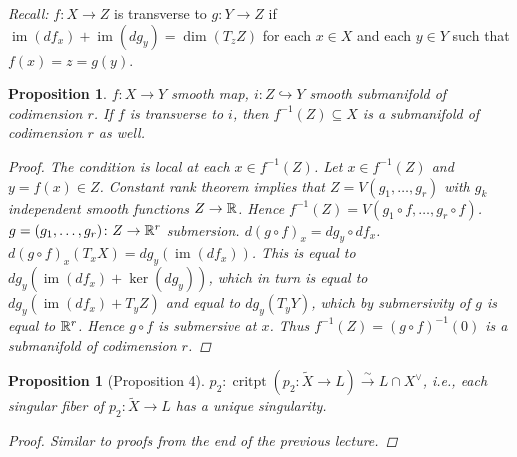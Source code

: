 \documentclass[A4paper, british, reqno]{amsart}
\theoremstyle{darkgreentheorem}
\newtheorem{prop}[thm]{Proposition}
\theoremstyle{darkbluedefinition}
\theoremstyle{darkredexample}
\theoremstyle{remark}
\DeclareMathOperator{\im}{im}
\newcommand{\1}{\mathbbm{1}}
\newcommand{\dual}{^{\vee}}
\newcommand{\sub}{\subseteq}
\newcommand{\mono}{\hookrightarrow}
\begin{document}
\textit{Recall:} $f\colon X\to Z$ is transverse to $g\colon Y\to Z$ if $\im(df_{x})+\im(dg_{y})=\dim(T_{z}Z)$ for each $x\in X$ and each $y\in Y$ such that $f(x)=z=g(y)$.

\begin{prop}
    $f\colon X\to Y$ smooth map, $i\colon Z\mono Y$ smooth submanifold of codimension $r$.
    If $f$ is transverse to $i$, then $f^{-1}(Z)\sub X$ is a submanifold of codimension $r$ as well.
    \begin{proof}
	The condition is local at each $x\in f^{-1}(Z)$.
	Let $x\in f^{-1}(Z)$ and $y=f(x)\in Z$.
	Constant rank theorem implies that $Z=V(g_{1},\ldots,g_{r})$ with $g_{k}$ independent smooth functions $Z\to \mathbb{R}$.
	Hence $f^{-1}(Z)=V(g_{1}\circ f,\ldots,g_{r}\circ f)$.
	$g=(g_{1},\ldots,g_{r})\colon Z\to \mathbb{R}^{r}$ submersion.
	$d(g\circ f)_{x}=dg_{y} \circ df_{x}$.
	$d(g\circ f)_{x}(T_{x}X)=dg_{y}(\im(df_{x}))$.
	This is equal to $dg_{y}(\im(df_{x})+\ker(dg_{y}))$, which in turn is equal to $dg_{y}(\im(df_{x})+T_{y}Z)$ and equal to $dg_{y}(T_{y}Y)$, which by submersivity of $g$ is equal to $\mathbb{R}^{r}$.
	Hence $g\circ f$ is submersive at $x$.
	Thus $f^{-1}(Z)=(g\circ f)^{-1}(0)$ is a submanifold of codimension $r$.
    \end{proof}
\end{prop}

\begin{prop}[Proposition 4]
    $p_{2}\colon \operatorname{critpt}(p_{2}\colon \tilde{X}\to L)\xrightarrow{\sim}L\cap X\dual$, i.e., each singular fiber of $p_{2}\colon \tilde{X}\to L$ has a unique singularity.
    \begin{proof}
	Similar to proofs from the end of the previous lecture.
    \end{proof}
\end{prop}
\end{document}
